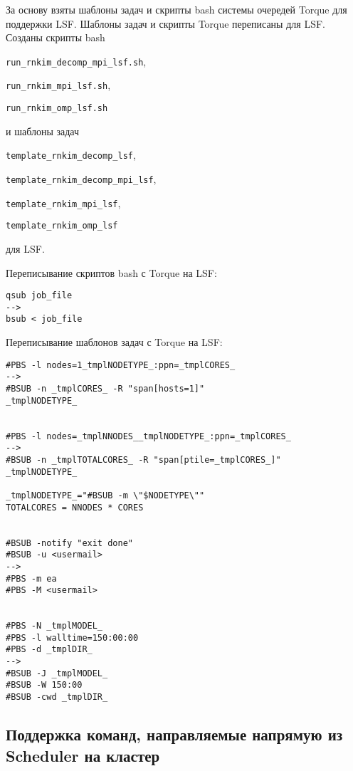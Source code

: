 За основу взяты шаблоны задач и скрипты bash системы очередей Torque для поддержки LSF. Шаблоны задач и скрипты Torque переписаны для LSF. Созданы скрипты bash

\lstinline{run_rnkim_decomp_mpi_lsf.sh},

\lstinline{run_rnkim_mpi_lsf.sh},

\lstinline{run_rnkim_omp_lsf.sh}

и шаблоны задач

\lstinline{template_rnkim_decomp_lsf},

\lstinline{template_rnkim_decomp_mpi_lsf},

\lstinline{template_rnkim_mpi_lsf},

\lstinline{template_rnkim_omp_lsf}

для LSF.

Переписывание скриптов bash с Torque на LSF:
{
\begin{lstlisting}
qsub job_file
-->
bsub < job_file
\end{lstlisting}
}

Переписывание шаблонов задач с Torque на LSF:
\begin{lstlisting}
#PBS -l nodes=1_tmplNODETYPE_:ppn=_tmplCORES_
-->
#BSUB -n _tmplCORES_ -R "span[hosts=1]"
_tmplNODETYPE_


#PBS -l nodes=_tmplNNODES__tmplNODETYPE_:ppn=_tmplCORES_
-->
#BSUB -n _tmplTOTALCORES_ -R "span[ptile=_tmplCORES_]"
_tmplNODETYPE_

_tmplNODETYPE_="#BSUB -m \"$NODETYPE\""
TOTALCORES = NNODES * CORES


#BSUB -notify "exit done"
#BSUB -u <usermail>
-->
#PBS -m ea
#PBS -M <usermail>


#PBS -N _tmplMODEL_
#PBS -l walltime=150:00:00
#PBS -d _tmplDIR_
-->
#BSUB -J _tmplMODEL_
#BSUB -W 150:00
#BSUB -cwd _tmplDIR_
\end{lstlisting}


\subsection{Поддержка команд, направляемые напрямую из Scheduler на кластер}

